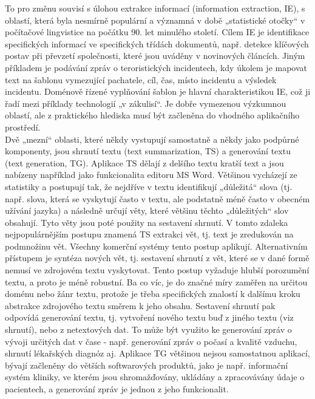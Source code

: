 \begin{multicols}{2}
To pro změnu souvisí s úlohou extrakce informací (information extraction, IE), s oblastí, která byla nesmírně populární a významná v době „statistické otočky“ v počítačové lingvistice na počátku 90. let minulého století. Cílem IE je identifikace specifických informací ve specifických třídách dokumentů, např. detekce klíčových postav při převzetí společnosti, které jsou uváděny v novinových článcích. Jiným příkladem je podávání zpráv o teroristických incidentech, kdy úkolem je mapovat text na šablonu vymezující pachatele, cíl, čas, místo incidentu a výsledek incidentu. Doménově řízené vyplňování šablon je hlavní charakteristikou IE, což ji řadí mezi příklady technologií „v zákulisí“. Je dobře vymezenou výzkumnou oblastí, ale z praktického hlediska musí být začleněna do vhodného aplikačního prostředí.\\
Dvě „mezní“ oblasti, které někdy vystupují samostatně a někdy jako podpůrné komponenty, jsou shrnutí textu (text summarization, TS) a generování textu (text generation, TG). Aplikace TS dělají z delšího textu kratší text a jsou nabízeny například jako funkcionalita editoru MS Word. Většinou vycházejí ze statistiky a postupují tak, že nejdříve v textu identifikují „důležitá“ slova (tj. např. slova, která se vyskytují často v textu, ale podstatně méně často v obecném užívání jazyka) a následně určují věty, které většinu těchto „důležitých“ slov obsahují. Tyto věty jsou poté použity na sestavení shrnutí. V tomto zdaleka nejpopulárnějším postupu znamená TS extrakci vět, tj. text je zredukován na podmnožinu vět. Všechny komerční systémy tento postup aplikují.
Alternativním přístupem je syntéza nových vět, tj. sestavení shrnutí z vět, které se v dané formě nemusí ve zdrojovém textu vyskytovat. Tento postup vyžaduje hlubší porozumění textu, a proto je méně robustní. Ba co víc, je do značné míry zaměřen na určitou doménu nebo žánr textu, protože je třeba specifických znalostí k dalšímu kroku abstrakce zdrojového textu směrem k jeho obsahu. Sestavení shrnutí pak odpovídá generování textu, tj. vytvoření nového textu buď z jiného textu (viz shrnutí), nebo z netextových dat. To může být využito ke generování zpráv o vývoji určitých dat v čase - např. generování zpráv o počasí a kvalitě vzduchu, shrnutí lékařských diagnóz aj. Aplikace TG většinou nejsou samostatnou aplikací, bývají začleněny do větších softwarových produktů, jako je např. informační systém kliniky, ve kterém jsou shromažďovány, ukládány a zpracovávány údaje o pacientech, a generování zpráv je jednou z jeho funkcionalit.


\end{multicols}
